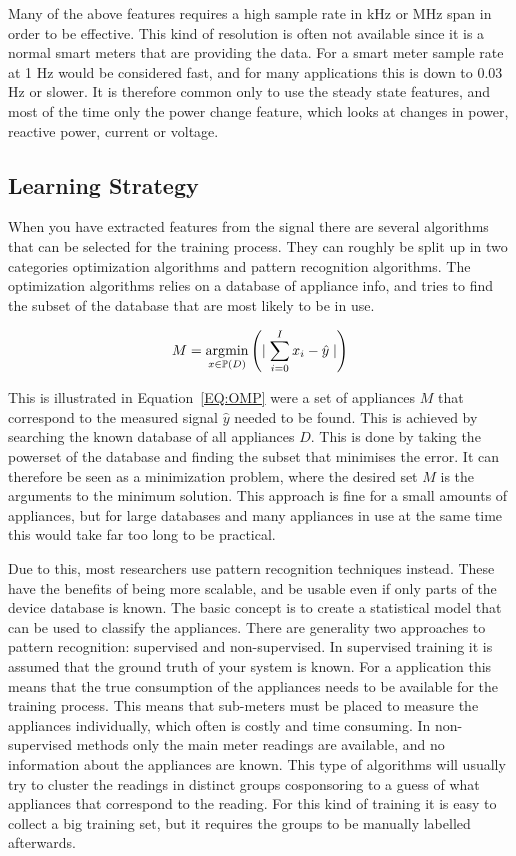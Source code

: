 Many of the above features requires a high sample rate in kHz or MHz span in order to be effective. This kind of resolution is often not available since it is a normal smart meters that are providing the data. For a smart meter sample rate at 1 Hz would be considered fast, and for many applications this is down to $0.03$ Hz or slower. It is therefore common only to use the steady state features, and most of the time only the power change feature, which looks at changes in power, reactive power, current or voltage. 

\subsection{Learning Strategy} 
When you have extracted features from the signal there are several algorithms that can be selected for the training process. They can roughly be split up in two categories optimization algorithms and pattern recognition algorithms. The optimization algorithms relies on a database of appliance info, and tries to find the subset of the database that are most likely to be in use. 

\begin{equation}
	M = \operatorname*{\arg\!\min}_{x \in \mathbb{P}(D) } \left( \mid {\sum_{i = 0}^{I} x_i - \hat{y}  \mid} \right)
	\label{EQ:OMP}
\end{equation}

This is illustrated in Equation~\ref{EQ:OMP} were a set of appliances $M$ that correspond to the measured signal $\hat{y}$ needed to be found. This is achieved by searching the known database of all appliances $D$. This is done by taking the powerset of the database and finding the subset that minimises the error. It can therefore be seen as a minimization problem, where the desired set $M$ is the arguments to the minimum solution. This approach is fine for a small amounts of appliances, but for large databases and many appliances in use at the same time this would take far too long to be practical. 

Due to this, most researchers use pattern recognition techniques instead. These have the benefits of being more scalable, and be usable even if only parts of the device database is known. The basic concept is to create a statistical model that can be used to classify the appliances. There are generality two approaches to pattern recognition: supervised and non-supervised. In supervised training it is assumed that the ground truth of your system is known. For a  application this means that the true consumption of the appliances needs to be available for the training process. This means that sub-meters must be placed to measure the appliances individually, which often is costly and time consuming. In non-supervised methods only the main meter readings are available, and no information about the appliances are known. This type of algorithms will usually try to cluster the readings in distinct groups cosponsoring to a guess of what appliances that correspond to the reading. For this kind of training it is easy to collect a big training set, but it requires the groups to be manually labelled afterwards.  
  
